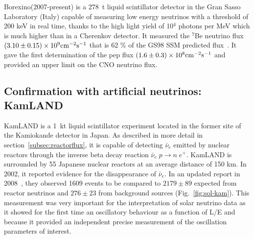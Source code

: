 Borexino(2007-present) is a 278~t liquid scintillator detector in the Gran Sasso Laboratory (Italy)
capable of measuring low energy neutrinos with a threshold of 200 keV in real time, thanks to the high light yield of 10$^4$ photons per MeV which is much higher than in a Cherenkov detector. 
It measured the $^7$Be neutrino flux $(3.10 \pm 0.15) \times 10^9 {\rm cm^{-2} s^{-1}}$ that is 62 \% of the GS98 SSM predicted flux~\cite{bellini}. It gave the first determination of the pep flux 
$(1.6 \pm 0.3) \times 10^8 { \rm cm^{-2} s^{-1}}$ and provided an upper limit on the CNO neutrino flux.


\subsection{Confirmation with artificial neutrinos: KamLAND}

KamLAND is a 1~kt liquid scintillator experiment located in the former site of the Kamiokande detector in Japan. As described in more detail in section~\ref{subsec:reactorflux}, it is capable of detecting $\bar \nu_e$ emitted by nuclear reactors through the inverse beta decay reaction $\bar{\nu}_e \; p \rightarrow n \;  e^+$. KamLAND is surrounded by 55 Japanese nuclear reactors at an average distance of 150 km. In 2002, it reported  evidence for the disappearance  of $\bar \nu_e$. In an updated report in 2008~\cite{kamland}, they observed 1609 
events to be compared to $2179 \pm 89$ expected from reactor neutrinos and  $276 \pm 23$ from background sources (Fig.~\ref{fig:sol-kam}). This measurement was very important for the interpretation of solar neutrino data as it showed for the first time an oscillatory behaviour as a function of L/E and because it provided an independent precise measurement of the oscillation parameters of interest.



